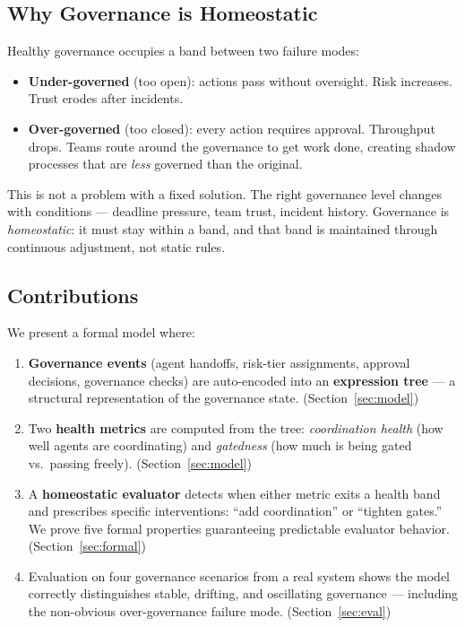 \documentclass[sigconf,nonacm]{acmart}
\begin{document}
\subsection{Why Governance is Homeostatic}

Healthy governance occupies a band between two failure modes:

\begin{itemize}[leftmargin=*]
  \item \textbf{Under-governed} (too open): actions pass without oversight.
    Risk increases. Trust erodes after incidents.
  \item \textbf{Over-governed} (too closed): every action requires approval.
    Throughput drops. Teams route around the governance to get work done,
    creating shadow processes that are \emph{less} governed than the original.
\end{itemize}

This is not a problem with a fixed solution. The right governance level
changes with conditions --- deadline pressure, team trust, incident history.
Governance is \emph{homeostatic}: it must stay within a band, and that band
is maintained through continuous adjustment, not static rules.

\subsection{Contributions}

We present a formal model where:

\begin{enumerate}[leftmargin=*]
  \item \textbf{Governance events} (agent handoffs, risk-tier assignments,
    approval decisions, governance checks) are auto-encoded into an
    \textbf{expression tree} --- a structural representation of the
    governance state. (Section~\ref{sec:model})

  \item Two \textbf{health metrics} are computed from the tree:
    \emph{coordination health} (how well agents are coordinating) and
    \emph{gatedness} (how much is being gated vs.\ passing freely).
    (Section~\ref{sec:model})

  \item A \textbf{homeostatic evaluator} detects when either metric exits a
    health band and prescribes specific interventions: ``add coordination''
    or ``tighten gates.'' We prove five formal properties guaranteeing
    predictable evaluator behavior. (Section~\ref{sec:formal})

  \item Evaluation on four governance scenarios from a real system shows the
    model correctly distinguishes stable, drifting, and oscillating
    governance --- including the non-obvious over-governance failure mode.
    (Section~\ref{sec:eval})
\end{enumerate}
\end{document}
